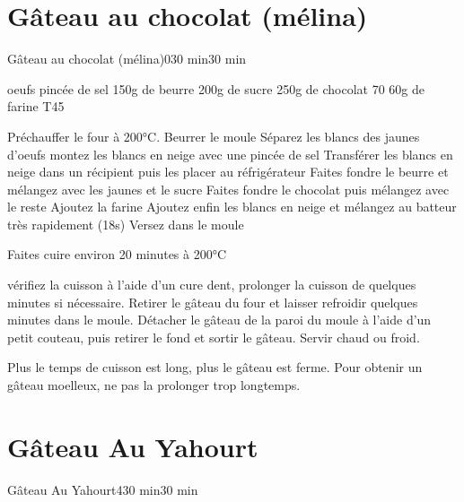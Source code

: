 {%
\section{Gâteau au chocolat (mélina)}
\begin{recette}{Gâteau au chocolat (mélina)}{0}{30 min}{30 min}

\begin{ingredients}
 oeufs
 pincée de sel
\ingredient 150g de beurre
\ingredient 200g de sucre
\ingredient 250g de chocolat 70%
\ingredient 60g de farine T45
\end{ingredients}

\begin{preparation}
\etape Préchauffer le four à 200°C. Beurrer le moule
\etape Séparez les blancs des jaunes d'oeufs
\etape montez les blancs en neige avec une pincée de sel
\etape Transférer les blancs en neige dans un récipient puis les placer au réfrigérateur
\etape Faites fondre le beurre et mélangez avec les jaunes et le sucre
\etape Faites fondre le chocolat puis mélangez avec le reste
\etape Ajoutez la farine
\etape Ajoutez enfin les blancs en neige et mélangez au batteur très rapidement (18s)
\etape Versez dans le moule
\end{preparation}

\begin{cuisson}
Faites cuire environ 20 minutes à 200°C

vérifiez la cuisson à l'aide d'un cure dent, prolonger la cuisson de quelques minutes si nécessaire. 
Retirer le gâteau du four et laisser refroidir quelques minutes dans le moule. Détacher le gâteau de la paroi du moule à l'aide d'un petit couteau, puis retirer le fond et sortir le gâteau. Servir chaud ou froid. 

\begin{remarque}
Plus le temps de cuisson est long, plus le gâteau est ferme. Pour obtenir un gâteau moelleux, ne pas la prolonger trop longtemps. 
\end{remarque}
\end{cuisson}
\end{recette}

\section{Gâteau Au Yahourt}
\begin{recette}{Gâteau Au Yahourt}{4}{30 min}{30 min}


\end{recette}}
